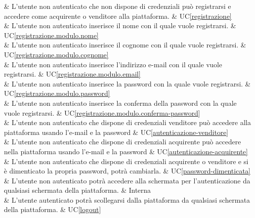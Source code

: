  & L'utente non autenticato che non dispone di credenziali può registrarsi e accedere come acquirente o venditore alla piattaforma. & UC\ref{registrazione} \\ 

 & L'utente non autenticato inserisce il nome con il quale vuole registrarsi. & UC\ref{registrazione.modulo.nome} \\

 & L'utente non autenticato inserisce il cognome con il quale vuole registrarsi. & UC\ref{registrazione.modulo.cognome} \\

 & L'utente non autenticato inserisce l'indirizzo e-mail con il quale vuole registrarsi. & UC\ref{registrazione.modulo.email} \\

 & L'utente non autenticato inserisce la password con la quale vuole registrarsi. & UC\ref{registrazione.modulo.password} \\

 & L'utente non autenticato inserisce la conferma della password con la quale vuole registrarsi. & UC\ref{registrazione.modulo.conferma-password} \\

 & L'utente non autenticato che dispone di credenziali venditore può accedere alla piattaforma usando l'e-mail e la password & UC\ref{autenticazione-venditore} \\

 & L'utente non autenticato che dispone di credenziali acquirente può accedere nella piattaforma usando l'e-mail e la password & UC\ref{autenticazione-acquirente} \\

 & L'utente non autenticato che dispone di credenziali acquirente o venditore e si è dimenticato la propria password, potrà cambiarla. & UC\ref{password-dimenticata} \\

 & L'utente non autenticato potrà accedere alla schermata per l'autenticazione da qualsiasi schermata della piattaforma. & Interna \\

 & L'utente autenticato potrà scollegarsi dalla piattaforma da qualsiasi schermata della piattaforma. & UC\ref{logout} \\
